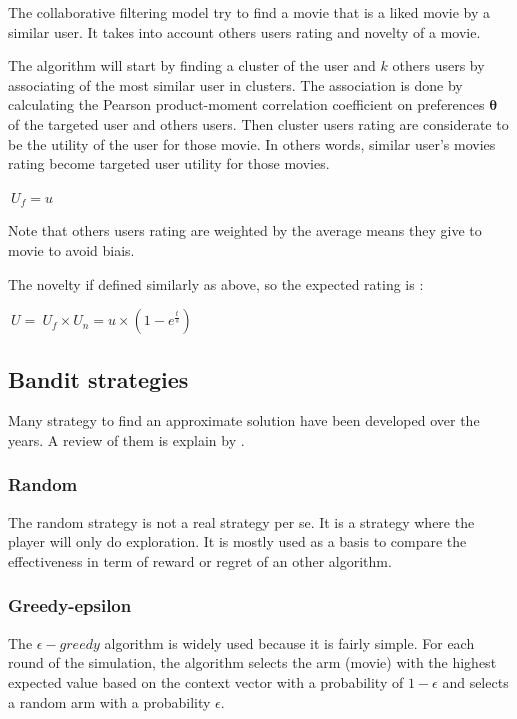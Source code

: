 \documentclass[letterpaper]{article}
\begin{document}
The collaborative filtering model try to find a movie that is a liked movie by a similar user. It takes into account others users rating and novelty of a movie.

The algorithm will start by finding a cluster of the user and $k$ others users by associating of the most similar user in clusters. The association is done by calculating the Pearson product-moment correlation coefficient on preferences $\boldsymbol{\theta}$ of the targeted user and others users. Then cluster users rating are considerate to be the utility of the user for those movie. In others words, similar user's movies rating become targeted user utility for those movies.

\begin{center}
	$ \ U_{f} = u $ 
\end{center}

Note that others users rating are weighted by the average means they give to movie to avoid biais.

The novelty if defined similarly as above, so the expected rating is :

\begin{center}
	$ \ U = \ U_{f} \times  U_{n} = u \times (1 - e^{\frac{t}{s}}) $ 
\end{center}



\subsection{Bandit strategies}

Many strategy to find an approximate solution have been developed over the years. A review of them is explain by \cite{kuleshov2014algorithms}.

\subsubsection{Random}

The random strategy is not a real strategy per se. It is a strategy where the player will only do exploration. It is mostly used as a basis to compare the effectiveness in term of reward or regret of an other algorithm.

\subsubsection{Greedy-epsilon}

The $\epsilon-greedy$ algorithm is widely used because it is fairly simple. For each round of the simulation, the algorithm selects the arm (movie) with the highest expected value based on the context vector with a probability of $1-\epsilon$ and selects a random arm with a probability $\epsilon$.
\end{document}
